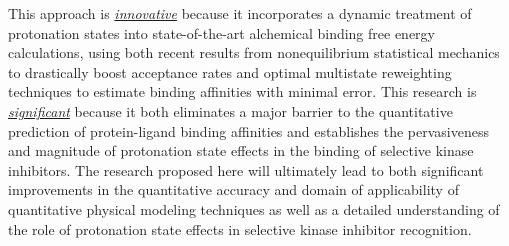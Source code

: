\documentclass[11pt]{article}
\begin{document}
\begin{centering}
This approach is \underline{\it innovative} because it incorporates a dynamic treatment of protonation states into state-of-the-art alchemical binding free energy calculations, using both recent results from nonequilibrium statistical mechanics to drastically boost acceptance rates and optimal multistate reweighting techniques to estimate binding affinities with minimal error.
This research is \underline{\it significant} because it both eliminates a major barrier to the quantitative prediction of protein-ligand binding affinities and establishes the pervasiveness and magnitude of protonation state effects in the binding of selective kinase inhibitors.
The research proposed here will ultimately lead to both significant improvements in the quantitative accuracy and domain of applicability of quantitative physical modeling techniques as well as a detailed understanding of the role of protonation state effects in selective kinase inhibitor recognition.
\end{centering}





%
%
%
%
\end{document}
